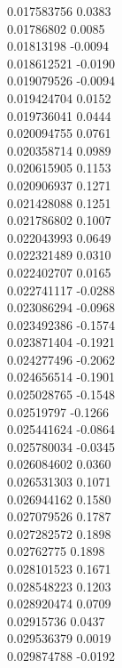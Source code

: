 {        0.017583756	0.0383\\
        0.01786802	0.0085\\
        0.01813198	-0.0094\\
        0.018612521	-0.0190\\
        0.019079526	-0.0094\\
        0.019424704	0.0152\\
        0.019736041	0.0444\\
        0.020094755	0.0761\\
        0.020358714	0.0989\\
        0.020615905	0.1153\\
        0.020906937	0.1271\\
        0.021428088	0.1251\\
        0.021786802	0.1007\\
        0.022043993	0.0649\\
        0.022321489	0.0310\\
        0.022402707	0.0165\\
        0.022741117	-0.0288\\
        0.023086294	-0.0968\\
        0.023492386	-0.1574\\
        0.023871404	-0.1921\\
        0.024277496	-0.2062\\
        0.024656514	-0.1901\\
        0.025028765	-0.1548\\
        0.02519797	-0.1266\\
        0.025441624	-0.0864\\
        0.025780034	-0.0345\\
        0.026084602	0.0360\\
        0.026531303	0.1071\\
        0.026944162	0.1580\\
        0.027079526	0.1787\\
        0.027282572	0.1898\\
        0.02762775	0.1898\\
        0.028101523	0.1671\\
        0.028548223	0.1203\\
        0.028920474	0.0709\\
        0.02915736	0.0437\\
        0.029536379	0.0019\\
        0.029874788	-0.0192\\
}
